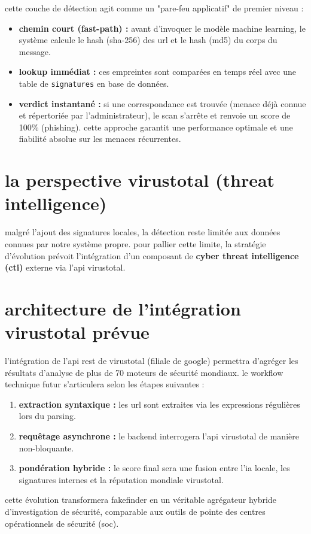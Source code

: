 \documentclass[12pt,a4paper]{report}
\begin{document}
cette couche de détection agit comme un "pare-feu applicatif" de premier niveau :
\begin{itemize}
    \item \textbf{chemin court (fast-path) :} avant d'invoquer le modèle machine learning, le système calcule le hash (sha-256) des url et le hash (md5) du corps du message.
    \item \textbf{lookup immédiat :} ces empreintes sont comparées en temps réel avec une table de \texttt{signatures} en base de données.
    \item \textbf{verdict instantané :} si une correspondance est trouvée (menace déjà connue et répertoriée par l'administrateur), le scan s'arrête et renvoie un score de 100\% (phishing). cette approche garantit une performance optimale et une fiabilité absolue sur les menaces récurrentes.
\end{itemize}

\section{la perspective virustotal (threat intelligence)}
malgré l'ajout des signatures locales, la détection reste limitée aux données connues par notre système propre. pour pallier cette limite, la stratégie d'évolution prévoit l'intégration d'un composant de \textbf{cyber threat intelligence (cti)} externe via l'api virustotal.

\section{architecture de l'intégration virustotal prévue}
l'intégration de l'api rest de virustotal (filiale de google) permettra d'agréger les résultats d'analyse de plus de 70 moteurs de sécurité mondiaux. le workflow technique futur s'articulera selon les étapes suivantes :
\begin{enumerate}
    \item \textbf{extraction syntaxique :} les url sont extraites via les expressions régulières lors du parsing.
    \item \textbf{requêtage asynchrone :} le backend interrogera l'api virustotal de manière non-bloquante.
    \item \textbf{pondération hybride :} le score final sera une fusion entre l'ia locale, les signatures internes et la réputation mondiale virustotal.
\end{enumerate}

cette évolution transformera fakefinder en un véritable agrégateur hybride d'investigation de sécurité, comparable aux outils de pointe des centres opérationnels de sécurité (soc).
\end{document}
